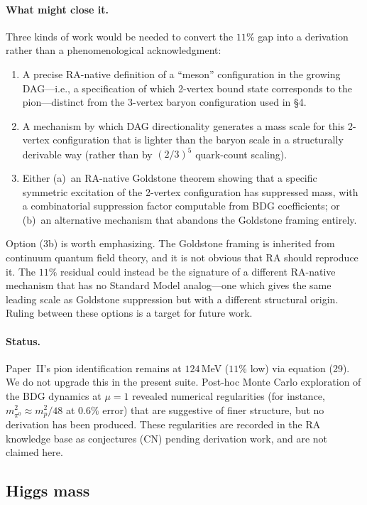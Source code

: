 \documentclass[11pt]{article}
\begin{document}
\paragraph{What might close it.} Three kinds of work would be needed to convert the $11\%$ gap into a derivation rather than a phenomenological acknowledgment:
\begin{enumerate}[nosep]
    \item A precise RA-native definition of a ``meson'' configuration in the growing DAG---i.e., a specification of which 2-vertex bound state corresponds to the pion---distinct from the 3-vertex baryon configuration used in \S4.
    \item A mechanism by which DAG directionality generates a mass scale for this 2-vertex configuration that is lighter than the baryon scale in a structurally derivable way (rather than by $(2/3)^5$ quark-count scaling).
    \item Either (a)~an RA-native Goldstone theorem showing that a specific symmetric excitation of the 2-vertex configuration has suppressed mass, with a combinatorial suppression factor computable from BDG coefficients; or (b)~an alternative mechanism that abandons the Goldstone framing entirely.
\end{enumerate}
Option (3b) is worth emphasizing. The Goldstone framing is inherited from continuum quantum field theory, and it is not obvious that RA should reproduce it. The $11\%$ residual could instead be the signature of a different RA-native mechanism that has no Standard Model analog---one which gives the same leading scale as Goldstone suppression but with a different structural origin. Ruling between these options is a target for future work.

\paragraph{Status.} Paper~II's pion identification remains at $124$\,MeV ($11\%$ low) via equation (29). We do not upgrade this in the present suite. Post-hoc Monte Carlo exploration of the BDG dynamics at $\mu=1$ revealed numerical regularities (for instance, $m_{\pi^0}^2\approx m_p^2/48$ at $0.6\%$ error) that are suggestive of finer structure, but no derivation has been produced. These regularities are recorded in the RA knowledge base as conjectures (CN) pending derivation work, and are not claimed here.

\subsection{Higgs mass}
\end{document}
